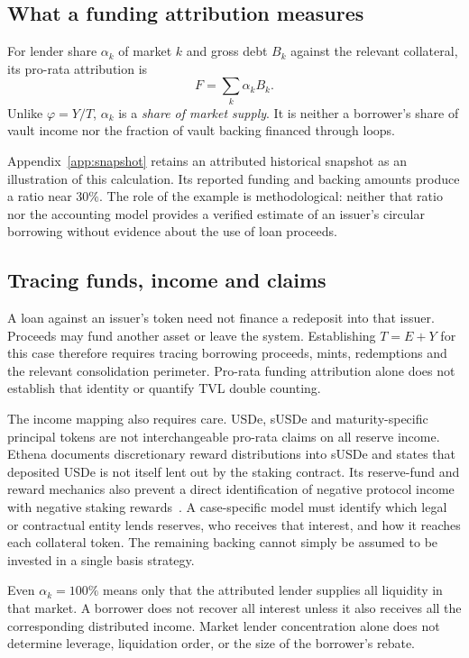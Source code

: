 \documentclass[12pt,oneside]{article}
\begin{document}
\subsection{What a funding attribution measures}
For lender share $\alpha_k$ of market $k$ and gross debt $B_k$ against
the relevant collateral, its pro-rata attribution is
\[
 F=\sum_k\alpha_k B_k.
\]
Unlike $\varphi=Y/T$, $\alpha_k$ is a \emph{share of market supply}.
It is neither a borrower's share of vault income nor the fraction of
vault backing financed through loops.

Appendix~\ref{app:snapshot} retains an attributed historical snapshot
as an illustration of this calculation. Its reported funding and
backing amounts produce a ratio near $30\%$. The role of the example
is methodological: neither that ratio nor the accounting model provides
a verified estimate of an issuer's circular borrowing without evidence
about the use of loan proceeds.

\subsection{Tracing funds, income and claims}
A loan against an issuer's token need not finance a redeposit into that
issuer. Proceeds may fund another asset or leave the system. Establishing
$T=E+Y$ for this case therefore requires tracing borrowing proceeds,
mints, redemptions and the relevant consolidation perimeter. Pro-rata
funding attribution alone does not establish that identity or quantify
TVL double counting.

The income mapping also requires care. USDe, sUSDe and maturity-specific
principal tokens are not interchangeable pro-rata claims on all reserve
income. Ethena documents discretionary reward distributions into sUSDe and states
that deposited USDe is not itself lent out by the staking contract. Its
reserve-fund and reward mechanics also prevent a direct identification
of negative protocol income with negative staking
rewards~\cite{ethena}.
A case-specific model must identify which legal or contractual entity
lends reserves, who receives that interest, and how it reaches each
collateral token. The remaining backing cannot simply be assumed to
be invested in a single basis strategy.

Even $\alpha_k=100\%$ means only that the attributed lender supplies
all liquidity in that market. A borrower does not recover all interest
unless it also receives all the corresponding distributed income.
Market lender concentration alone does not determine leverage,
liquidation order, or the size of the borrower's rebate.
\end{document}
